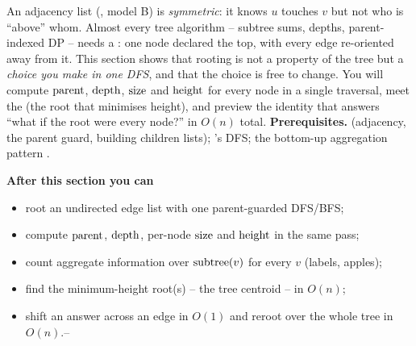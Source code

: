 \begin{topicintro}
An adjacency list (, model B) is \emph{symmetric}: it knows $u$ touches
$v$ but not who is ``above'' whom. Almost every tree algorithm -- subtree sums, depths,
parent-indexed DP -- needs a : one node declared the top, with every edge
re-oriented away from it. This section shows that rooting is not a property of the tree
but a \emph{choice you make in one DFS}, and that the choice is free to change. You will
compute $\operatorname{parent}$, $\operatorname{depth}$, $\operatorname{size}$ and $\operatorname{height}$ for every node in a single traversal,
meet the  (the root that minimises height), and preview the 
identity that answers ``what if the root were every node?'' in $O(n)$ total.
\textbf{Prerequisites.}  (adjacency, the parent guard, building children
lists); 's DFS; the bottom-up aggregation pattern .

\textbf{After this section you can}
\begin{itemize}[nosep]
  \item root an undirected edge list with one parent-guarded DFS/BFS;              \hfill{}
  \item compute $\operatorname{parent}$, $\operatorname{depth}$, per-node $\operatorname{size}$ and $\operatorname{height}$ in the same pass;\hfill{}
  \item count aggregate information over $\operatorname{subtree}(v)$ for every $v$ (labels, apples);\hfill{}
  \item find the minimum-height root(s) -- the tree centroid -- in $O(n)$;         \hfill{}
  \item shift an answer across an edge in $O(1)$ and reroot over the whole tree in $O(n)$.\hfill{}--
\end{itemize}
\end{topicintro}

